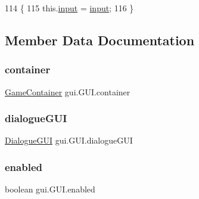 \begin{DoxyCode}
114                                       \{
115         this.\mbox{\hyperlink{classgui_1_1_g_u_i_ac55a04087c6c03c6d36d5143e0353c00}{input}} = \mbox{\hyperlink{classgui_1_1_g_u_i_ac55a04087c6c03c6d36d5143e0353c00}{input}};
116     \}
\end{DoxyCode}


\subsection{Member Data Documentation}
\mbox{\label{classgui_1_1_g_u_i_acaa3c69a02ef67d6ebd11fcbcc87049d}} 
\subsubsection{\texorpdfstring{container}{container}}
{\footnotesize\ttfamily \mbox{\hyperlink{classorg_1_1newdawn_1_1slick_1_1_game_container}{Game\+Container}} gui.\+G\+U\+I.\+container\hspace{0.3cm}{\ttfamily [private]}}

\mbox{\label{classgui_1_1_g_u_i_ae48d5f580a490dd73bc59e64937cc46f}} 
\subsubsection{\texorpdfstring{dialogue\+G\+UI}{dialogueGUI}}
{\footnotesize\ttfamily \mbox{\hyperlink{classgui_1_1_dialogue_g_u_i}{Dialogue\+G\+UI}} gui.\+G\+U\+I.\+dialogue\+G\+UI\hspace{0.3cm}{\ttfamily [private]}}

\mbox{\label{classgui_1_1_g_u_i_ac666fbd257937cf3560d48acafe419ce}} 
\subsubsection{\texorpdfstring{enabled}{enabled}}
{\footnotesize\ttfamily boolean gui.\+G\+U\+I.\+enabled\hspace{0.3cm}{\ttfamily [private]}}


